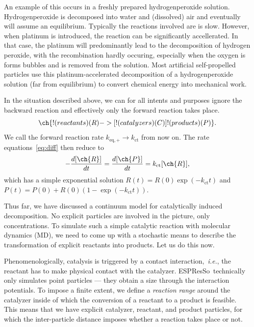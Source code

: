 \documentclass[aip,jcp,reprint,a4paper,onecolumn,nofootinbib,amsmath,amssymb]{revtex4-1}
\newcommand{\es}{\mbox{\textsf{ESPResSo}}\xspace}
\begin{document}
An example of this occurs in a freshly prepared hydrogenperoxide solution. Hydrogenperoxide is decomposed into water and (dissolved) air and eventually will assume an equilibrium. Typically the reactions involved are is slow. However, when platinum is introduced, the reaction can be significantly accellerated. In that case, the platinum will predominantly lead to the decomposition of hydrogen peroxide, with the recombination hardly occuring, especially when the oxygen is forms bubbles and is removed from the solution. Most artificial self-propelled particles use this platinum-accelerated decomposition of a hydrogenperoxide solution (far from equilibrium) to convert chemical energy into mechanical work.  

In the situation described above, we can for all intents and purposes ignore the backward reaction and effectively only the forward reaction takes place.
\begin{equation}
  \label{eq:cat}
  \ch{!(reactants)(R) ->[ !(catalyzers)(C) ] !(products)(P)} .
\end{equation}
We call the forward reaction rate $k_{\text{eq},+} \to k_{\text{ct}}$ from now on. The rate equations~\eqref{eq:diff} then reduce to
\begin{equation}
  \label{eq:diff-cat}
  -\frac{d[\ch{R}]}{dt} = \frac{d[\ch{P}]}{dt} = k_{\text{ct}}[\ch{R}] ,
\end{equation}
which has a simple exponential solution $R(t) = R(0)\exp(- k_{\text{ct}} t)$ and $P(t) = P(0) + R(0)(1 - \exp(- k_{\text{ct}} t))$.

Thus far, we have discussed a continuum model for catalytically induced decomposition. No explicit particles are involved in the picture, only concentrations. To simulate such a simple catalytic reaction with molecular dynamics (MD), we need to come up with a stochastic means to describe the transformation of explicit reactants into products. Let us do this now.

Phenomenologically, catalysis is triggered by a contact interaction,~\textit{i.e.}, the reactant has to make physical contact with the catalyzer. \es\ technically only simulates point particles --- they obtain a size through the interaction potentials. To impose a finite extent, we define a \textit{reaction range} around the catalyzer inside of which the conversion of a reactant to a product is feasible. This means that we have explicit catalyzer, reactant, and product particles, for which the inter-particle distance imposes whether a reaction takes place or not.
\end{document}
